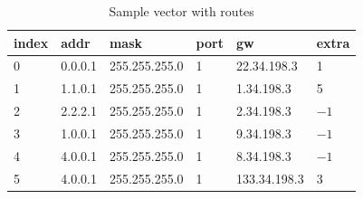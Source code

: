 \documentclass[a4paper]{article}
\begin{document}
\begin{table}[float=tph]
\begin{center}
\begin{tabular}{|l|l|l|l|l|l|}
\hline index & addr & mask & port & gw & extra\\ 
\hline 0 & 0.0.0.1 & 255.255.255.0 & 1& 22.34.198.3 & 1\\ 
\hline 1 & 1.1.0.1 & 255.255.255.0 & 1& 1.34.198.3 & 5\\
\hline 2 & 2.2.2.1 & 255.255.255.0 & 1& 2.34.198.3 & $-1$\\
\hline 3 & 1.0.0.1 & 255.255.255.0 & 1& 9.34.198.3 & $-1$\\
\hline 4 & 4.0.0.1 & 255.255.255.0 & 1& 8.34.198.3 & $-1$\\
\hline 5 & 4.0.0.1 & 255.255.255.0 & 1& 133.34.198.3 & 3\\
\hline
\end{tabular}
\end{center}
\caption{Sample vector with routes}
\label{tbl:vector}
\end{table}
\end{document}
